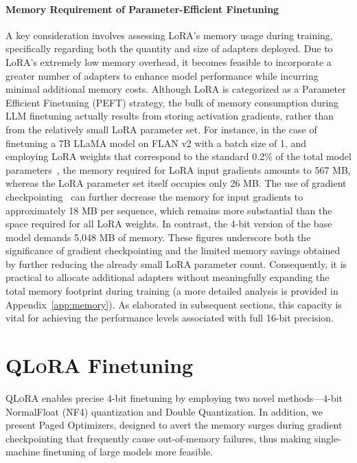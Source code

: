 \paragraph{Memory Requirement of Parameter-Efficient Finetuning} A key consideration involves assessing LoRA’s memory usage during training, specifically regarding both the quantity and size of adapters deployed. Due to LoRA’s extremely low memory overhead, it becomes feasible to incorporate a greater number of adapters to enhance model performance while incurring minimal additional memory costs. Although LoRA is categorized as a Parameter Efficient Finetuning (PEFT) strategy, the bulk of memory consumption during LLM finetuning actually results from storing activation gradients, rather than from the relatively small LoRA parameter set. For instance, in the case of finetuning a 7B LLaMA model on FLAN v2 with a batch size of 1, and employing LoRA weights that correspond to the standard 0.2\% of the total model parameters~\citep{hu2021lora,liu2022few}, the memory required for LoRA input gradients amounts to 567 MB, whereas the LoRA parameter set itself occupies only 26 MB. The use of gradient checkpointing~\citep{chen2016training} can further decrease the memory for input gradients to approximately 18 MB per sequence, which remains more substantial than the space required for all LoRA weights. In contrast, the 4-bit version of the base model demands 5,048 MB of memory. These figures underscore both the significance of gradient checkpointing and the limited memory savings obtained by further reducing the already small LoRA parameter count. Consequently, it is practical to allocate additional adapters without meaningfully expanding the total memory footprint during training (a more detailed analysis is provided in Appendix~\ref{app:memory}). As elaborated in subsequent sections, this capacity is vital for achieving the performance levels associated with full 16-bit precision.

\section{\textsc{QLoRA} Finetuning}

\textsc{QLoRA} enables precise 4-bit finetuning by employing two novel methods—4-bit NormalFloat (NF4) quantization and Double Quantization. In addition, we present Paged Optimizers, designed to avert the memory surges during gradient checkpointing that frequently cause out-of-memory failures, thus making single-machine finetuning of large models more feasible.


